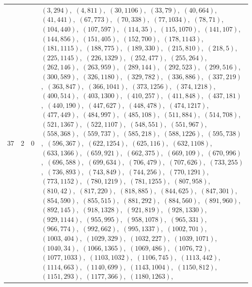 \documentclass[11pt]{article}
\begin{document}
\begin{longtable}{@{}rrl>{\raggedright\arraybackslash}p{}@{}}
37 & 2 & $0$ & $(3,294)$,\allowbreak\ $(4,811)$,\allowbreak\ $(30,1106)$,\allowbreak\ $(33,79)$,\allowbreak\ $(40,664)$,\allowbreak\ $(41,441)$,\allowbreak\ $(67,773)$,\allowbreak\ $(70,338)$,\allowbreak\ $(77,1034)$,\allowbreak\ $(78,71)$,\allowbreak\ $(104,440)$,\allowbreak\ $(107,597)$,\allowbreak\ $(114,35)$,\allowbreak\ $(115,1070)$,\allowbreak\ $(141,107)$,\allowbreak\ $(144,856)$,\allowbreak\ $(151,405)$,\allowbreak\ $(152,700)$,\allowbreak\ $(178,1143)$,\allowbreak\ $(181,1115)$,\allowbreak\ $(188,775)$,\allowbreak\ $(189,330)$,\allowbreak\ $(215,810)$,\allowbreak\ $(218,5)$,\allowbreak\ $(225,1145)$,\allowbreak\ $(226,1329)$,\allowbreak\ $(252,477)$,\allowbreak\ $(255,264)$,\allowbreak\ $(262,146)$,\allowbreak\ $(263,959)$,\allowbreak\ $(289,144)$,\allowbreak\ $(292,523)$,\allowbreak\ $(299,516)$,\allowbreak\ $(300,589)$,\allowbreak\ $(326,1180)$,\allowbreak\ $(329,782)$,\allowbreak\ $(336,886)$,\allowbreak\ $(337,219)$,\allowbreak\ $(363,847)$,\allowbreak\ $(366,1041)$,\allowbreak\ $(373,1256)$,\allowbreak\ $(374,1218)$,\allowbreak\ $(400,514)$,\allowbreak\ $(403,1300)$,\allowbreak\ $(410,257)$,\allowbreak\ $(411,848)$,\allowbreak\ $(437,181)$,\allowbreak\ $(440,190)$,\allowbreak\ $(447,627)$,\allowbreak\ $(448,478)$,\allowbreak\ $(474,1217)$,\allowbreak\ $(477,449)$,\allowbreak\ $(484,997)$,\allowbreak\ $(485,108)$,\allowbreak\ $(511,884)$,\allowbreak\ $(514,708)$,\allowbreak\ $(521,1367)$,\allowbreak\ $(522,1107)$,\allowbreak\ $(548,551)$,\allowbreak\ $(551,967)$,\allowbreak\ $(558,368)$,\allowbreak\ $(559,737)$,\allowbreak\ $(585,218)$,\allowbreak\ $(588,1226)$,\allowbreak\ $(595,738)$,\allowbreak\ $(596,367)$,\allowbreak\ $(622,1254)$,\allowbreak\ $(625,116)$,\allowbreak\ $(632,1108)$,\allowbreak\ $(633,1366)$,\allowbreak\ $(659,921)$,\allowbreak\ $(662,375)$,\allowbreak\ $(669,109)$,\allowbreak\ $(670,996)$,\allowbreak\ $(696,588)$,\allowbreak\ $(699,634)$,\allowbreak\ $(706,479)$,\allowbreak\ $(707,626)$,\allowbreak\ $(733,255)$,\allowbreak\ $(736,893)$,\allowbreak\ $(743,849)$,\allowbreak\ $(744,256)$,\allowbreak\ $(770,1291)$,\allowbreak\ $(773,1152)$,\allowbreak\ $(780,1219)$,\allowbreak\ $(781,1255)$,\allowbreak\ $(807,958)$,\allowbreak\ $(810,42)$,\allowbreak\ $(817,220)$,\allowbreak\ $(818,885)$,\allowbreak\ $(844,625)$,\allowbreak\ $(847,301)$,\allowbreak\ $(854,590)$,\allowbreak\ $(855,515)$,\allowbreak\ $(881,292)$,\allowbreak\ $(884,560)$,\allowbreak\ $(891,960)$,\allowbreak\ $(892,145)$,\allowbreak\ $(918,1328)$,\allowbreak\ $(921,819)$,\allowbreak\ $(928,1330)$,\allowbreak\ $(929,1144)$,\allowbreak\ $(955,995)$,\allowbreak\ $(958,1078)$,\allowbreak\ $(965,331)$,\allowbreak\ $(966,774)$,\allowbreak\ $(992,662)$,\allowbreak\ $(995,1337)$,\allowbreak\ $(1002,701)$,\allowbreak\ $(1003,404)$,\allowbreak\ $(1029,329)$,\allowbreak\ $(1032,227)$,\allowbreak\ $(1039,1071)$,\allowbreak\ $(1040,34)$,\allowbreak\ $(1066,1365)$,\allowbreak\ $(1069,486)$,\allowbreak\ $(1076,72)$,\allowbreak\ $(1077,1033)$,\allowbreak\ $(1103,1032)$,\allowbreak\ $(1106,745)$,\allowbreak\ $(1113,442)$,\allowbreak\ $(1114,663)$,\allowbreak\ $(1140,699)$,\allowbreak\ $(1143,1004)$,\allowbreak\ $(1150,812)$,\allowbreak\ $(1151,293)$,\allowbreak\ $(1177,366)$,\allowbreak\ $(1180,1263)$,\allowbreak\ 
\end{longtable}
\end{document}
